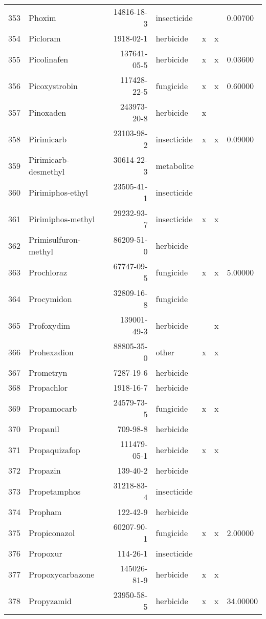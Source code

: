 \begin{longtable}{lp{3cm}rlp{1cm}p{1cm}p{1.5cm}}
  353 & Phoxim & 14816-18-3 & insecticide &  &  & 0.00700 \\ 
  354 & Picloram & 1918-02-1 & herbicide & x & x &  \\ 
  355 & Picolinafen & 137641-05-5 & herbicide & x & x & 0.03600 \\ 
  356 & Picoxystrobin & 117428-22-5 & fungicide & x & x & 0.60000 \\ 
  357 & Pinoxaden & 243973-20-8 & herbicide & x &  &  \\ 
  358 & Pirimicarb & 23103-98-2 & insecticide & x & x & 0.09000 \\ 
  359 & Pirimicarb-desmethyl & 30614-22-3 & metabolite &  &  &  \\ 
  360 & Pirimiphos-ethyl & 23505-41-1 & insecticide &  &  &  \\ 
  361 & Pirimiphos-methyl & 29232-93-7 & insecticide & x & x &  \\ 
  362 & Primisulfuron-methyl & 86209-51-0 & herbicide &  &  &  \\ 
  363 & Prochloraz & 67747-09-5 & fungicide & x & x & 5.00000 \\ 
  364 & Procymidon & 32809-16-8 & fungicide &  &  &  \\ 
  365 & Profoxydim & 139001-49-3 & herbicide &  & x &  \\ 
  366 & Prohexadion & 88805-35-0 & other & x & x &  \\ 
  367 & Prometryn & 7287-19-6 & herbicide &  &  &  \\ 
  368 & Propachlor & 1918-16-7 & herbicide &  &  &  \\ 
  369 & Propamocarb & 24579-73-5 & fungicide & x & x &  \\ 
  370 & Propanil & 709-98-8 & herbicide &  &  &  \\ 
  371 & Propaquizafop & 111479-05-1 & herbicide & x & x &  \\ 
  372 & Propazin & 139-40-2 & herbicide &  &  &  \\ 
  373 & Propetamphos & 31218-83-4 & insecticide &  &  &  \\ 
  374 & Propham & 122-42-9 & herbicide &  &  &  \\ 
  375 & Propiconazol & 60207-90-1 & fungicide & x & x & 2.00000 \\ 
  376 & Propoxur & 114-26-1 & insecticide &  &  &  \\ 
  377 & Propoxycarbazone & 145026-81-9 & herbicide & x & x &  \\ 
  378 & Propyzamid & 23950-58-5 & herbicide & x & x & 34.00000 \\ 

\end{longtable}
